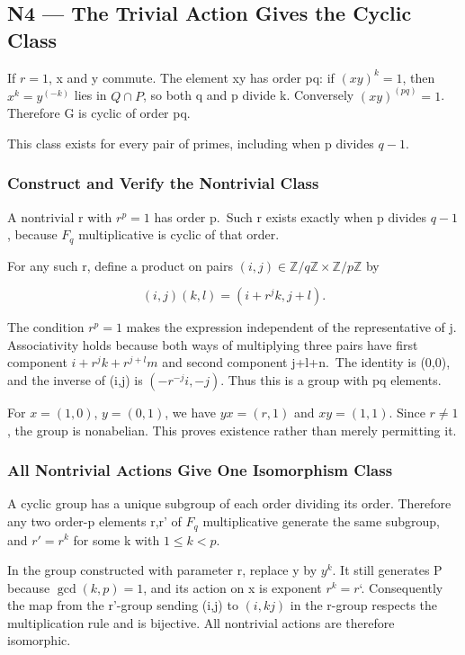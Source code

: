 \documentclass[preprint,12pt,aps,pra,showkeys,amsmath,amssymb,superscriptaddress,floatfix]{revtex4-2}
\theoremstyle{definition}
\theoremstyle{remark}
\begin{document}
\subsection{N4 --- The Trivial Action Gives the Cyclic
Class}\label{n4-the-trivial-action-gives-the-cyclic-class}

If \(r=1\), x and y commute. The element xy has order pq: if
\((xy)^k=1\), then \(x^k=y^{(-k)}\) lies in \(Q\cap P\), so both q and p
divide k. Conversely \((xy)^{(pq)}=1\). Therefore G is cyclic of order
pq.

This class exists for every pair of primes, including when p divides
\(q-1\).

\subsubsection{Construct and Verify the Nontrivial
Class}\label{construct-and-verify-the-nontrivial-class}

A nontrivial r with \(r^p=1\) has order p.~Such r exists exactly when p
divides \(q-1\), because \(F_q\) multiplicative is cyclic of that order.

For any such r, define a product on pairs
\((i,j)\in\mathbb Z/q\mathbb Z\times\mathbb Z/p\mathbb Z\) by

\[(i,j)(k,l)=(i+r^jk,j+l).\]

The condition \(r^p=1\) makes the expression independent of the
representative of j. Associativity holds because both ways of
multiplying three pairs have first component \(i+r^jk+r^{j+l}m\) and
second component j+l+n.~The identity is (0,0), and the inverse of (i,j)
is \((-r^{-j}i,-j)\). Thus this is a group with pq elements.

For \(x=(1,0)\), \(y=(0,1)\), we have \(yx=(r,1)\) and \(xy=(1,1)\).
Since \(r\ne 1\), the group is nonabelian. This proves existence rather
than merely permitting it.

\subsubsection{All Nontrivial Actions Give One Isomorphism
Class}\label{all-nontrivial-actions-give-one-isomorphism-class}

A cyclic group has a unique subgroup of each order dividing its order.
Therefore any two order-p elements r,r' of \(F_q\) multiplicative
generate the same subgroup, and \(r'=r^k\) for some k with \(1\le k<p\).

In the group constructed with parameter r, replace y by \(y^k\). It
still generates P because \(\operatorname{gcd} (k,p)=1\), and its action
on x is exponent \(r^k=r\)`. Consequently the map from the r'-group
sending (i,j) to \((i,kj)\) in the r-group respects the multiplication
rule and is bijective. All nontrivial actions are therefore isomorphic.
\end{document}
